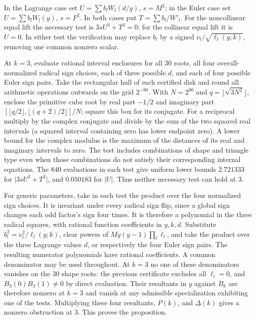 \documentclass[11pt,letterpaper]{article}
\theoremstyle{definition}
\begin{document}
In the Lagrange case set \(U=\sum b_l W_l(d/y)\), \(s=M^2\); in the
Euler case set \(U=\sum b_l W_l(y)\), \(s=F^2\). In both cases put
\(T=\sum b_l/W'_l\).
For the noncollinear equal lift the necessary test is \(3s U^3+T^3=0\);
for the collinear equal lift it is \(U=0\).
In either test the verification may replace \(b_l\) by a signed
\(\nu_l/\sqrt{\ell_l(y;k)}\), removing one common nonzero scalar.

At \(k=3\), evaluate rational interval enclosures for
all 30 roots, all four overall-normalized radical sign choices, each
of three possible \(d\), and each of four possible Euler sign pairs.
Take the rectangular hull of each certified disk and round all arithmetic operations outwards on the grid $2^{-80}$. With $N=2^{80}$ and $q=\lfloor\sqrt{3N^2}\rfloor$, enclose the primitive cube root by real part $-1/2$ and imaginary part $[\lfloor q/2\rfloor,\lfloor(q+2)/2\rfloor]/N$; square this box for its conjugate. For a reciprocal multiply by the complex conjugate and divide by the sum of the two squared real intervals (a squared interval containing zero has lower endpoint zero). A lower bound for the complex modulus is the maximum of the distances of its real and imaginary intervals to zero.
The test includes combinations of shape and triangle type even when those
combinations do not satisfy their corresponding internal equations.
The 840 evaluations in each test give uniform lower bounds
\(2.721333\) for \(\lvert 3sU^3+T^3\rvert\), and \(0.050183\) for
\(\lvert U\rvert\). Thus neither necessary test can hold at \(3\).

For generic parameters, take in each test the product over the four
normalized sign choices. It is invariant under every radical sign
flip, since a global sign changes each odd factor's sign four times.
It is therefore a polynomial in the three radical squares, with rational
function coefficients in \(y,k,d\). Substitute
\(b_l^2=\nu_l^2/\ell_l(y;k)\), clear powers of
\(M y(y-1)\prod_l\ell_l\), and take the product over the three
Lagrange values \(d\), or respectively the four Euler sign pairs.
The resulting numerator polynomials have rational coefficients.
A common denominator may be used throughout. At \(k=3\) no one
of these denominators vanishes on the 30 shape roots: the previous
certificate excludes all \(\ell_l=0\), and \(B_3(0)B_3(1)\ne0\)
by direct evaluation. Their resultants in \(y\) against \(B_k\)
are therefore nonzero at \(k=3\) and vanish at any admissible
specialization exhibiting one of the tests. Multiplying these four
resultants, $P(k)$, and $\Delta(k)$ gives a nonzero obstruction at 3. This proves the proposition.
\end{document}

